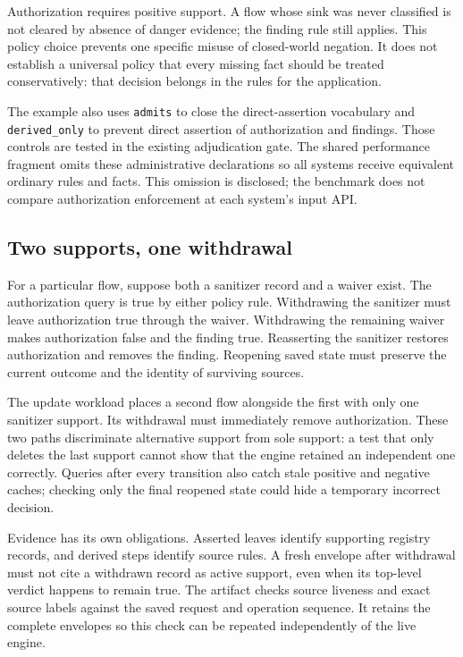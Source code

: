Authorization requires positive support. A flow whose sink was never classified
is not cleared by absence of danger evidence; the finding rule still applies.
This policy choice prevents one specific misuse of closed-world negation.
It does not establish a universal policy that every missing fact should be
treated conservatively: that decision belongs in the rules for the application.

The example also uses \texttt{admits} to close the direct-assertion vocabulary and
\texttt{derived\_only} to prevent direct assertion of authorization and findings.
Those controls are tested in the existing adjudication gate. The shared
performance fragment omits these administrative declarations so all systems
receive equivalent ordinary rules and facts. This omission is disclosed; the
benchmark does not compare authorization enforcement at each system's input API.

\subsection{Two supports, one withdrawal}
\label{sec:case-update}

For a particular flow, suppose both a sanitizer record and a waiver exist.
The authorization query is true by either policy rule. Withdrawing the sanitizer
must leave authorization true through the waiver. Withdrawing the remaining
waiver makes authorization false and the finding true. Reasserting the sanitizer
restores authorization and removes the finding. Reopening saved state must
preserve the current outcome and the identity of surviving sources.

The update workload places a second flow alongside the first with only one
sanitizer support. Its withdrawal must immediately remove authorization.
These two paths discriminate alternative support from sole support: a test that
only deletes the last support cannot show that the engine retained an independent
one correctly. Queries after every transition also catch stale positive and
negative caches; checking only the final reopened state could hide a temporary
incorrect decision.

Evidence has its own obligations. Asserted leaves identify supporting registry
records, and derived steps identify source rules. A fresh envelope after withdrawal
must not cite a withdrawn record as active support, even when its top-level
verdict happens to remain true. The artifact checks source liveness and exact
source labels against the saved request and operation sequence. It retains the
complete envelopes so this check can be repeated independently of the live engine.


